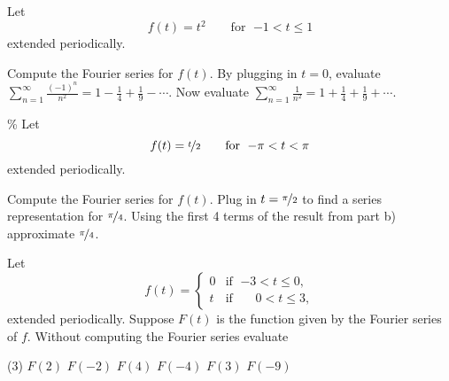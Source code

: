 \documentclass{ximera}
\begin{document}
\begin{exercise}
    Let
    \begin{equation*}
        f(t) = t^2 \qquad \text{for } \; {-1} < t \leq 1
    \end{equation*}
    extended periodically.
    \begin{tasks}
        \task Compute the Fourier series for $f(t)$.
        \task By plugging in $t=0$, evaluate $\displaystyle \sum_{n=1}^\infty \frac{{(-1)}^n}{n^2} = 1 - \frac{1}{4} + \frac{1}{9} - \cdots$.
        \task Now evaluate $\displaystyle \sum_{n=1}^\infty \frac{1}{n^2} = 1 + \frac{1}{4} + \frac{1}{9} + \cdots$.
    \end{tasks}
\end{exercise}

\begin{exercise}\%
    Let
    \begin{equation*}
        f(t) = \nicefrac{t}{2} \qquad \text{for } \; {-\pi} < t < \pi
    \end{equation*}
    extended periodically.
    \begin{tasks}
        \task Compute the Fourier series for $f(t)$.
        \task Plug in $t=\nicefrac{\pi}{2}$ to find a series representation for $\nicefrac{\pi}{4}$.
        \task Using the first 4 terms of the result from part b) approximate $\nicefrac{\pi}{4}$.
    \end{tasks}
\end{exercise}

\begin{exercise}
    Let
    \begin{equation*}
        f(t) =
        \begin{cases}
            0 & \text{if } \; {-3} < t \leq 0, \\
            t & \text{if } \; \phantom{-}0 < t \leq 3,
        \end{cases}
    \end{equation*}
    extended periodically.  Suppose $F(t)$ is the function given by the Fourier series of $f$.  Without computing the Fourier series evaluate
    \begin{tasks}(3)
        \task $F(2)$
        \task $F(-2)$
        \task $F(4)$
        \task $F(-4)$
        \task $F(3)$
        \task $F(-9)$
    \end{tasks}
\end{exercise}
\end{document}
